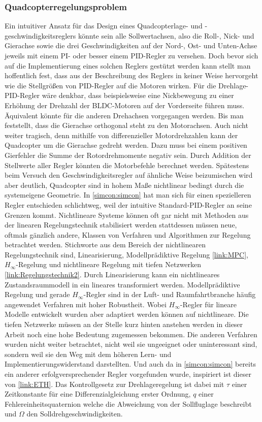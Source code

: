 \subsubsection{\label{Quadcopterregelungsproblem}Quadcopterregelungsproblem}
Ein intuitiver Ansatz für das Design eines Quadcopterlage- und -geschwindigkeitsreglers könnte sein alle Sollwertachsen, also die Roll-, Nick- und Gierachse sowie die drei Geschwindigkeiten auf der Nord-, Ost- und Unten-Achse jeweils mit einem PI- oder besser einem PID-Regler zu versehen. Doch bevor sich auf die Implementierung eines solchen Reglers gestützt werden kann stellt man hoffentlich fest, dass aus der Beschreibung des Reglers in keiner Weise hervorgeht wie die Stellgrößen von PID-Regler auf die Motoren wirken. Für die Drehlage-PID-Regler wäre denkbar, dass beispielsweise eine Nickbewegung zu einer Erhöhung der Drehzahl der BLDC-Motoren auf der Vorderseite führen muss. Äquivalent könnte für die anderen Drehachsen vorgegangen werden. Bis man feststellt, dass die Gierachse orthogonal steht zu den Motorachsen. Auch nicht weiter tragisch, denn mithilfe von differenzieller Motordrehzahlen kann der Quadcopter um die Gierachse gedreht werden. Dazu muss bei einem positiven Gierfehler die Summe der Rotordrehmomente negativ sein. Durch Addition der Stellwerte aller Regler könnten die Motorbefehle berechnet werden. Spätestens beim Versuch den Geschwindigkeitsregler auf ähnliche Weise beizumischen wird aber deutlich, Quadcopter sind in hohem Maße nichtlinear bedingt durch die systemeigene Geometrie. In \ref{simcon:simcon} hat man sich für einen spezielleren Regler entschieden schlichtweg, weil der intuitive Standard-PID-Regler an seine Grenzen kommt. Nichtlineare Systeme können oft gar nicht mit Methoden aus der linearen Regelungstechnik stabilisiert werden stattdessen müssen neue, oftmals gänzlich andere, Klassen von Verfahren und Algorithmen zur Regelung betrachtet werden. Stichworte aus dem Bereich der nichtlinearen Regelungstechnik sind, Linearisierung, Modellprädiktive Regelung \ref{link:MPC}, $H_{\infty}$-Regelung und nichtlineare Regelung mit tiefen Netzwerken \ref{link:Regelungstechnik2}. Durch Linearisierung kann ein nichtlineares Zustandsraummodell in ein lineares transformiert werden. Modellprädiktive Regelung und gerade $H_{\infty}$-Regler sind in der Luft- und Raumfahrtbranche häufig angewendet Verfahren mit hoher Robustheit. Wobei $H_{\infty}$-Regler für lineare Modelle entwickelt wurden aber adaptiert werden können auf nichtlineare. Die tiefen Netzwerke müssen an der Stelle kurz hinten anstehen werden in dieser Arbeit noch eine hohe Bedeutung zugemessen bekommen. Die anderen Verfahren wurden nicht weiter betrachtet, nicht weil sie ungeeignet oder uninteressant sind, sondern weil sie den Weg mit dem höheren Lern- und Implementierungswiderstand darstellten. Und auch da in \ref{simcon:simcon} bereits ein anderer erfolgversprechender Regler vorgefunden wurde, inspiriert ist dieser von \ref{link:ETH}. Das Kontrollgesetz zur Drehlageregelung ist dabei mit $\tau$ einer Zeitkonstante für eine Differenzialgleichung erster Ordnung, $q$ einer Fehlereinheitsquaternion welche die Abweichung von der Sollfluglage beschreibt und $\Omega$ den Solldrehgeschwindigkeiten.
